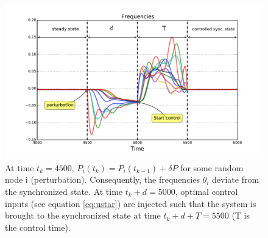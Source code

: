 \documentclass[conference]{IEEEtran}
\begin{document}
\begin{figure}
\includegraphics[scale=.38]{./figure_2/figure_2.pdf}
\caption{At time $ t_k=4500 $, $P_i(t_k) = P_i(t_{k-1}) + \delta P$ for some random node i (perturbation). Consequently, the frequencies $ \dot{ \theta }_i $ deviate from the synchronized state. At time $ t_k + d = 5000$, optimal control inputs (see equation \ref{eq:ustar}) are injected such that the system is brought to the synchronized state at time $ t_k + d + T = 5500 $ (T is the control time).} 


\label{fig:frequecies}
\end{figure}
\end{document}
